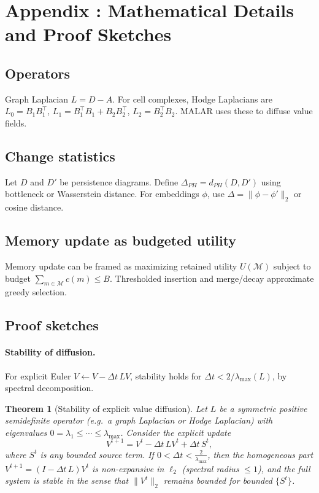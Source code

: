 \documentclass[11pt,english]{article}
\newtheorem{theorem}{Theorem}
\theoremstyle{remark}
\begin{document}
\newpage
\appendix
\section{Appendix : Mathematical Details and Proof Sketches}
\subsection{Operators}
Graph Laplacian $L = D-A$. For cell complexes, Hodge Laplacians are
$L_0=B_1B_1^\top$, $L_1=B_1^\top B_1 + B_2B_2^\top$, $L_2=B_2^\top B_2$.
MALAR uses these to diffuse value fields.

\subsection{Change statistics}
Let $D$ and $D'$ be persistence diagrams. Define $\Delta_{PH}=d_{PH}(D,D')$ using bottleneck or Wasserstein distance.
For embeddings $\phi$, use $\Delta=\|\phi-\phi'\|_2$ or cosine distance.

\subsection{Memory update as budgeted utility}
Memory update can be framed as maximizing retained utility $U(\mathcal{M})$ subject to budget $\sum_{m\in\mathcal{M}} c(m)\le B$.
Thresholded insertion and merge/decay approximate greedy selection.

\subsection{Proof sketches}
\paragraph{Stability of diffusion.} For explicit Euler $V\leftarrow V-\Delta t\,LV$, stability holds for $\Delta t < 2/\lambda_{\max}(L)$,
by spectral decomposition.

\begin{theorem}[Stability of explicit value diffusion]
	\label{thm:diffusion-stability}
	Let $L$ be a symmetric positive semidefinite operator (e.g.\ a graph Laplacian or Hodge Laplacian) with eigenvalues
	$0=\lambda_1\le \cdots \le \lambda_{\max}$. Consider the explicit update
	\[
	V^{t+1} = V^t - \Delta t\, L V^t + \Delta t\, S^t,
	\]
	where $S^t$ is any bounded source term. If $0<\Delta t < \frac{2}{\lambda_{\max}}$, then the homogeneous part
	$V^{t+1}= (I-\Delta t\,L)V^t$ is non-expansive in $\ell_2$ (spectral radius $\le 1$), and the full system is stable
	in the sense that $\|V^t\|_2$ remains bounded for bounded $\{S^t\}$.
\end{theorem}
\end{document}
